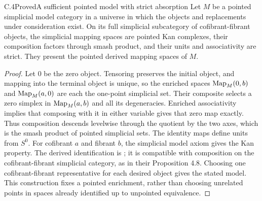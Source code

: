\begin{result}{C.4}{Proved}{A sufficient pointed model with strict absorption}
Let $M$ be a pointed simplicial model category in a universe in which the objects and replacements under consideration exist. On its full simplicial subcategory of cofibrant-fibrant objects, the simplicial mapping spaces are pointed Kan complexes, their composition factors through smash product, and their units and associativity are strict. They present the pointed derived mapping spaces of $M$.
\end{result}
\begin{proof}
Let $0$ be the zero object. Tensoring preserves the initial object, and mapping into the terminal object is unique, so the enriched spaces $\operatorname{Map}_M(0,b)$ and $\operatorname{Map}_M(a,0)$ are each the one-point simplicial set. Their composite selects a zero simplex in $\operatorname{Map}_M(a,b)$ and all its degeneracies. Enriched associativity implies that composing with it in either variable gives that zero map exactly. Thus composition descends levelwise through the quotient by the two axes, which is the smash product of pointed simplicial sets. The identity maps define units from $S^0$. For cofibrant $a$ and fibrant $b$, the simplicial model axiom gives the Kan property. The derived identification is \citet[Corollary 4.7]{DwyerKan1980Function}; it is compatible with composition on the cofibrant-fibrant simplicial category, as in their Proposition 4.8. Choosing one cofibrant-fibrant representative for each desired object gives the stated model. This construction fixes a pointed enrichment, rather than choosing unrelated points in spaces already identified up to unpointed equivalence.
\end{proof}

